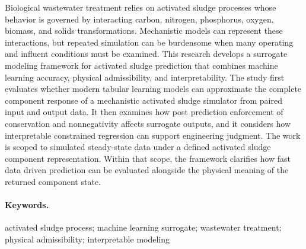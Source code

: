 \documentclass[12pt, twoside]{book}
\makeatletter
\newcommand{\@singlepar@cr}[1][]{\unskip\space\ignorespaces}
\newenvironment{singlepar}{%
    \def\par{\unskip\space\ignorespaces}%
    \def\newline{\unskip\space\ignorespaces}%
    \renewcommand{\\}{\@ifstar{\@singlepar@cr}{\@singlepar@cr}}%
    \ignorespaces
}{%
  \endgraf
}
\makeatother
\begin{document}
\begin{singlepar}
    Biological wastewater treatment relies on activated sludge processes whose behavior is governed by
    interacting carbon, nitrogen, phosphorus, oxygen, biomass, and solids transformations. Mechanistic models
    can represent these interactions, but repeated simulation can be burdensome when many operating and
    influent conditions must be examined. This research develops a surrogate modeling framework for activated
    sludge prediction that combines machine learning accuracy, physical admissibility, and interpretability.
    The study first evaluates whether modern tabular learning models can approximate the complete component
    response of a mechanistic activated sludge simulator from paired input and output data. It then examines
    how post prediction enforcement of conservation and nonnegativity affects surrogate outputs, and it
    considers how interpretable constrained regression can support engineering judgment. The work is scoped to
    simulated steady-state data under a defined activated sludge component representation. Within that scope,
    the framework clarifies how fast data driven prediction can be evaluated alongside the physical meaning of
    the returned component state.
\end{singlepar}

\paragraph*{Keywords.} activated sludge process; machine learning surrogate; wastewater treatment; physical
admissibility; interpretable modeling



\cleardoublepage
\tableofcontents



\newpage
\listoffigures
\listoftables
\listofalgorithms

\glsfindwidesttoplevelname
\printunsrtglossary[
    type=acronym,
    style=customacronyms,
    title={List of Abbreviations},
    nonumberlist
]

\printunsrtglossary[
    type=symbols,
    style=customsymbols,
    title={List of Symbols},
    nonumberlist
]



\mainmatter
\pagestyle{headings}
\end{document}
